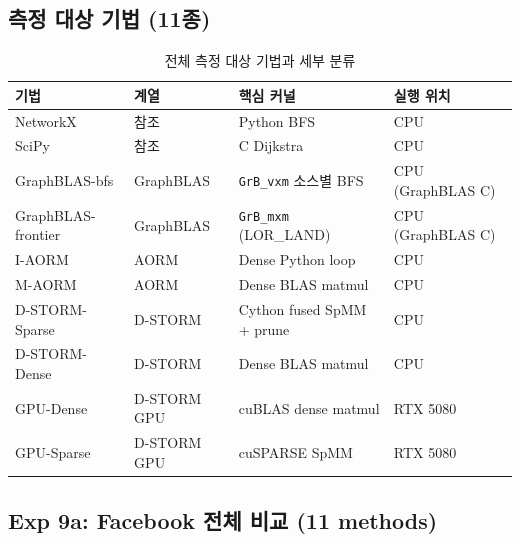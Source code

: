 \documentclass[11pt,a4paper]{article}
\begin{document}
\subsection{측정 대상 기법 (11종)}

\begin{table}[ht]\centering
\caption{전체 측정 대상 기법과 세부 분류}
\small
\begin{tabular}{@{}llll@{}}
\toprule
\textbf{기법} & \textbf{계열} & \textbf{핵심 커널} & \textbf{실행 위치} \\
\midrule
NetworkX & 참조 & Python BFS & CPU \\
SciPy & 참조 & C Dijkstra & CPU \\
GraphBLAS-bfs & GraphBLAS & \texttt{GrB\_vxm} 소스별 BFS & CPU (GraphBLAS C) \\
GraphBLAS-frontier & GraphBLAS & \texttt{GrB\_mxm} (LOR\_LAND) & CPU (GraphBLAS C) \\
I-AORM & AORM & Dense Python loop & CPU \\
M-AORM & AORM & Dense BLAS matmul & CPU \\
D-STORM-Sparse & D-STORM & Cython fused SpMM + prune & CPU \\
D-STORM-Dense & D-STORM & Dense BLAS matmul & CPU \\
GPU-Dense & D-STORM GPU & cuBLAS dense matmul & RTX 5080 \\
GPU-Sparse & D-STORM GPU & cuSPARSE SpMM & RTX 5080 \\
\bottomrule
\end{tabular}
\end{table}

\subsection{Exp 9a: Facebook 전체 비교 (11 methods)}
\end{document}
